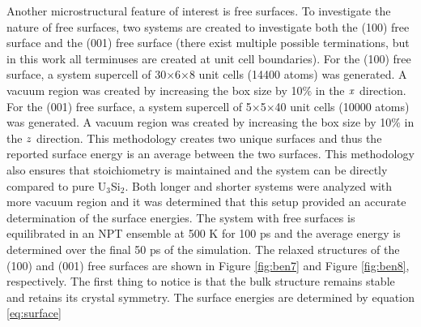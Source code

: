 \documentclass[review]{elsarticle}
\begin{document}

\FloatBarrier

Another microstructural feature of interest is free surfaces.  To investigate the nature of free surfaces, two systems are created to investigate both the (100) free surface and the (001) free surface (there exist multiple possible terminations, but in this work all terminuses are created at unit cell boundaries).  For the (100) free surface, a system supercell of 30$\times$6$\times$8 unit cells (14400 atoms) was generated.  A vacuum region was created by increasing the box size by 10$\%$ in the $\it{x}$ direction.  For the (001) free surface, a system supercell of 5$\times$5$\times$40 unit cells (10000 atoms) was generated.  A vacuum region was created by increasing the box size by 10$\%$ in the $\it{z}$ direction.  This methodology creates two unique surfaces and thus the reported surface energy is an average between the two surfaces.  This methodology also ensures that stoichiometry is maintained and the system can be directly compared to pure U$_{3}$Si$_{2}$.  Both longer and shorter systems were analyzed with more vacuum region and it was determined that this setup provided an accurate determination of the surface energies.  The system with free surfaces is equilibrated in an NPT ensemble at 500 K for 100 ps and the average energy is determined over the final 50 ps of the simulation.  The relaxed structures of the (100) and (001) free surfaces are shown in Figure \ref{fig:ben7} and Figure \ref{fig:ben8}, respectively.  The first thing to notice is that the bulk structure remains stable and retains its crystal symmetry.  The surface energies are determined by equation \ref{eq:surface}
\end{document}
